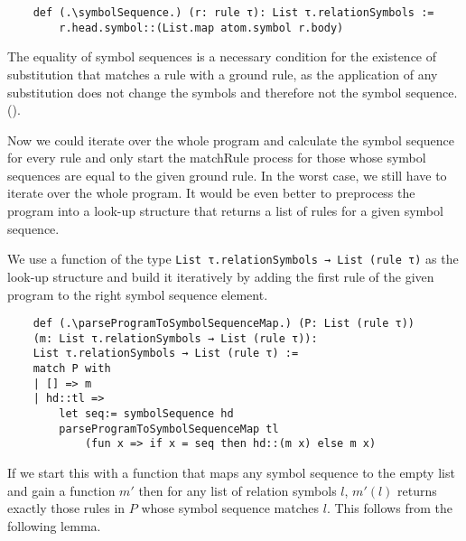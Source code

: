 \begin{lstlisting}
    def (.\symbolSequence.) (r: rule τ): List τ.relationSymbols := 
        r.head.symbol::(List.map atom.symbol r.body)

\end{lstlisting}

The equality of symbol sequences is a necessary condition for the existence of substitution that matches a rule with a ground rule, as the application of any substitution does not change the symbols and therefore not the symbol sequence. (\symbolSequenceNotEq).

Now we could iterate over the whole program and calculate the symbol sequence for every rule and only start the matchRule process for those whose symbol sequences are equal to the given ground rule. In the worst case, we still have to iterate over the whole program. It would be even better to preprocess the program into a look-up structure that returns a list of rules for a given symbol sequence.

We use a function of the type \lstinline|List τ.relationSymbols → List (rule τ)| as the look-up structure and build it iteratively by adding the first rule of the given program to the right symbol sequence element.

\begin{lstlisting}
    def (.\parseProgramToSymbolSequenceMap.) (P: List (rule τ)) 
    (m: List τ.relationSymbols → List (rule τ)): 
    List τ.relationSymbols → List (rule τ) :=
    match P with
    | [] => m
    | hd::tl =>
        let seq:= symbolSequence hd
        parseProgramToSymbolSequenceMap tl 
            (fun x => if x = seq then hd::(m x) else m x)
\end{lstlisting}

If we start this with a function that maps any symbol sequence to the empty list and gain a function $m'$ then for any list of relation symbols $l$, $m'(l)$ returns exactly those rules in $P$ whose symbol sequence matches $l$. This follows from the following lemma.

